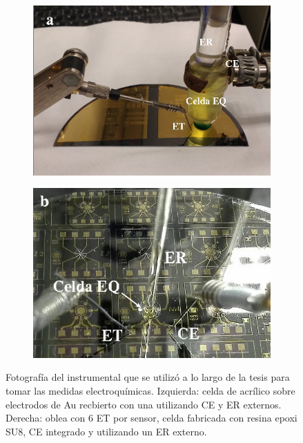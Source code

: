 			 \begin{figure}[h!]
			  		 \begin{subfigure}[t]{0.495\textwidth}
			  		  \includegraphics[width=\textwidth]{Imagenes/EQ1.jpg}
			  		  \end{subfigure}
			  		  \begin{subfigure}[t]{0.495\textwidth}
			  		  \includegraphics[width=\textwidth]{Imagenes/EQ2.jpg}
			  		  \end{subfigure}
			  \caption[Equipo para realizar la medidas electroquímicas]{Fotografía del instrumental que se utilizó a lo largo de la tesis para tomar las medidas electroquímicas. Izquierda: celda de acrílico sobre electrodos de Au recbierto con una \pdm\space utilizando CE y ER externos. Derecha: oblea con 6 ET por sensor, celda fabricada con resina epoxi SU8, CE integrado y utilizando un ER externo.}
			  		 \label{fig:celda}
			 		 \end{figure}	
					

